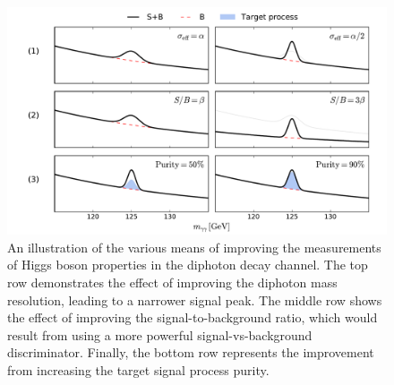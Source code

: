 \begin{figure}[htb]
  \centering
  \includegraphics[width=1\textwidth]{Figures/hgg_overview/hgg_improve_measurement.pdf}
  \caption[Avenues for improving \Hgg measurements.]
  {
    An illustration of the various means of improving the measurements of Higgs boson properties in the diphoton decay channel. The top row demonstrates the effect of improving the diphoton mass resolution, leading to a narrower signal peak. The middle row shows the effect of improving the signal-to-background ratio, which would result from using a more powerful signal-vs-background discriminator. Finally, the bottom row represents the improvement from increasing the target signal process purity.
  }
  \label{fig:hgg_overview_improving_measurements}
\end{figure}

